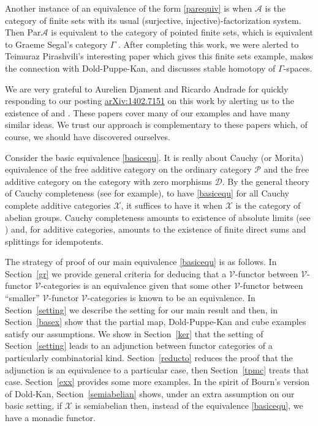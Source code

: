 \documentclass[a4paper,12pt,reqno]{amsart}
\theoremstyle{definition}
\theoremstyle{fact}
\theoremstyle{genquest}
\theoremstyle{step}
\def\CA{{\mathscr A}}
\def\CD{{\mathscr D}}
\def\CP{{\mathscr P}}
\def\CV{{\mathscr V}}
\def\CX{{\mathscr X}}
\begin{document}
Another instance of an equivalence of the form \eqref{parequiv} is when
$\CA$ is the category of finite sets with its usual (surjective, injective)-factorization
system. Then $\mathrm{Par}\CA$ is equivalent to the 
category of pointed finite sets,
which is equivalent to Graeme Segal's category $\Gamma$ \cite{Segal}. 
After completing this work, we were alerted to Teimuraz Pirashvili's interesting 
paper \cite{Pirash00} which gives this finite sets example, 
makes the connection with Dold-Puppe-Kan, and discusses stable homotopy of 
$\Gamma$-spaces.  

We are very grateful to Aurelien Djament and Ricardo Andrade for quickly 
responding to our posting \url{arXiv:1402.7151} on this work by alerting us to the
existence of \cite{Slom} and \cite{Helm}. 
These papers cover many of our examples and have many similar ideas. 
We trust our approach is complementary to these papers which, of course, 
we should have discovered ourselves.  

Consider the basic equivalence \eqref{basicequ}. It is really about Cauchy (or Morita)
equivalence of the free additive category on the ordinary category $\CP$
and the free additive category on the category with zero morphisms $\CD$. 
By the general theory of Cauchy completeness (see \cite{ECC} for example),
to have \eqref{basicequ} for all Cauchy complete additive categories $\CX$, it
suffices to have it when $\CX$ is the category of abelian groups. 
Cauchy completeness amounts to existence of absolute limits (see \cite{ACEC})
and, for additive categories,
amounts to the existence of finite direct sums and splittings for idempotents. 

The strategy of proof of our main equivalence \eqref{basicequ} is as follows.
In Section~\ref{gr} we provide general criteria for deducing that a $\CV$-functor
between $\CV$-functor $\CV$-categories is an equivalence given that some other
$\CV$-functor between ``smaller'' $\CV$-functor $\CV$-categories is known to
be an equivalence. 
In Section~\ref{setting} we describe the setting for our main result and then,
in Section~\ref{basex} show that the partial map, Dold-Puppe-Kan and 
cube examples satisfy our assumptions. 
We show in Section~\ref{ker} that the setting of Section~\ref{setting} 
leads to an adjunction between functor categories of a particularly combinatorial kind.
Section~\ref{reducto} reduces the proof that the adjunction is an equivalence to a
particular case, then Section~\ref{tpmc} treats that case.
Section~\ref{exx} provides some more examples.
In the spirit of Bourn's version \cite{Bourn07} of Dold-Kan, 
Section~\ref{semiabelian} shows, under an extra assumption on our basic setting, 
if $\CX$ is semiabelian then, instead of
the equivalence \eqref{basicequ}, we have a monadic functor.
\end{document}
